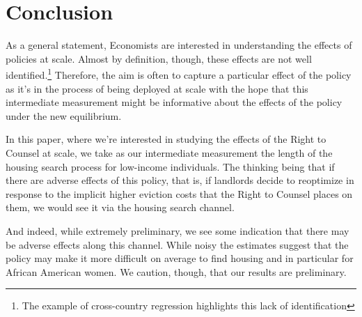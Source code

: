 \documentclass[a4paper,12pt]{article}
\begin{document}
\section{Conclusion}
As a general statement, Economists are interested in understanding the effects of policies at scale. Almost by definition, though, these effects are not well identified.\footnote{The example of cross-country regression highlights this lack of identification} Therefore, the aim is often to capture a particular effect of the policy as it's in the process of being deployed at scale with the hope that this intermediate measurement might be informative about the effects of the policy under the new equilibrium.\par 
In this paper, where we're interested in studying the effects of the Right to Counsel at scale, we take as our intermediate measurement the length of the housing search process for low-income individuals. The thinking being that if there are adverse effects of this policy, that is, if landlords decide to reoptimize in response to the implicit higher eviction costs that the Right to Counsel places on them, we would see it via the housing search channel. \par 
And indeed, while extremely preliminary, we see some indication that there may be adverse effects along this channel. While noisy the estimates suggest that the policy may make it more difficult on average to find housing and in particular for African American women. We caution, though, that our results are preliminary. 

%

\end{document}

